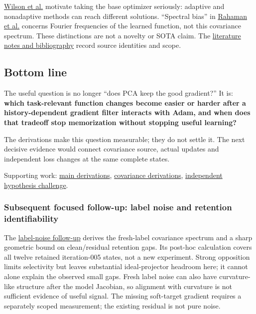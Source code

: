 \documentclass[
  british,
  10pt,
  a4paper,
]{article}
\begin{document}
\href{https://arxiv.org/abs/1705.08292}{Wilson et al.} motivate taking
the base optimizer seriously: adaptive and nonadaptive methods can reach
different solutions. ``Spectral bias'' in
\href{https://arxiv.org/abs/1806.08734}{Rahaman et al.} concerns Fourier
frequencies of the learned function, not this covariance spectrum. These
distinctions are not a novelty or SOTA claim. The
\href{../analysis/mathematical-followup-literature.md}{literature notes
and bibliography} record source identities and scope.

\subsection{Bottom line}\label{mathematics--bottom-line}

The useful question is no longer ``does PCA keep the good gradient?'' It
is: \textbf{which task-\allowbreak{}relevant function changes become
easier or harder after a history-\allowbreak{}dependent gradient filter
interacts with Adam, and when does that tradeoff stop memorization
without stopping useful learning?}

The derivations make this question measurable; they do not settle it.
The next decisive evidence would connect covariance source, actual
updates and independent loss changes at the same complete states.

Supporting work:
\href{../analysis/mathematical-followup-main-derivations.md}{main
derivations},
\href{../analysis/mathematical-followup-covariance.md}{covariance
derivations},
\href{../analysis/mathematical-followup-hypotheses.md}{independent
hypothesis challenge}.

\subsubsection{Subsequent focused follow-up: label noise and retention
identifiability}\label{mathematics--subsequent-focused-follow-up-label-noise-and-retention-identifiability}

The \hyperref[label-noise]{label-\allowbreak{}noise follow-up} derives
the fresh-\allowbreak{}label covariance spectrum and a sharp geometric
bound on clean/\allowbreak{}residual retention gaps. Its post-hoc
calculation covers all twelve retained iteration-\allowbreak{}005
states, not a new experiment.\allowbreak{} Strong opposition limits
selectivity but leaves substantial ideal-\allowbreak{}projector headroom
here; it cannot alone explain the observed small gaps. Fresh label noise
can also have curvature-\allowbreak{}like structure after the model
Jacobian, so alignment with curvature is not sufficient evidence of
useful signal. The missing soft-\allowbreak{}target gradient requires a
separately scoped measurement; the existing residual is not pure noise.
\end{document}
